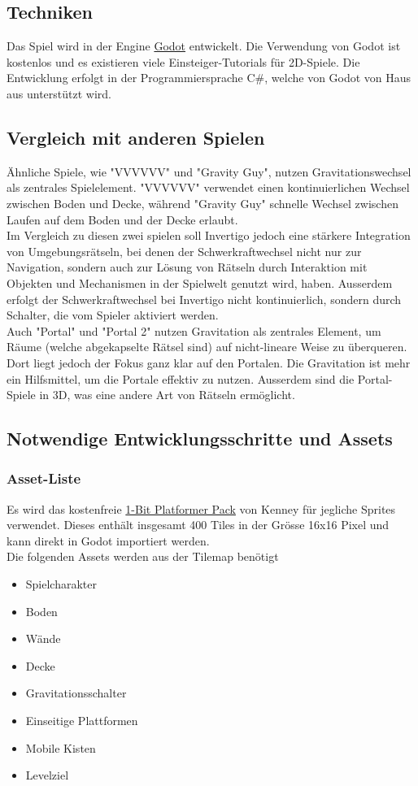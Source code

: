 \documentclass{article}
\begin{document}
\subsection{Techniken}
Das Spiel wird in der Engine \href{https://godotengine.org/}{Godot} entwickelt. Die Verwendung von Godot ist kostenlos und es existieren viele Einsteiger-Tutorials für 2D-Spiele.
Die Entwicklung erfolgt in der Programmiersprache C\#, welche von Godot von Haus aus unterstützt wird.

\subsection{Vergleich mit anderen Spielen}

Ähnliche Spiele, wie "VVVVVV" und "Gravity Guy", nutzen Gravitationswechsel als zentrales Spielelement.
"VVVVVV" verwendet einen kontinuierlichen Wechsel zwischen Boden und Decke, während "Gravity Guy" schnelle Wechsel zwischen Laufen auf dem Boden und der Decke erlaubt.
\\
Im Vergleich zu diesen zwei spielen soll Invertigo jedoch eine stärkere Integration von Umgebungsrätseln, bei denen der Schwerkraftwechsel nicht nur zur Navigation,
sondern auch zur Lösung von Rätseln durch Interaktion mit Objekten und Mechanismen in der Spielwelt genutzt wird, haben.
Ausserdem erfolgt der Schwerkraftwechsel bei Invertigo nicht kontinuierlich, sondern durch Schalter, die vom Spieler aktiviert werden.
\\
Auch "Portal" und "Portal 2" nutzen Gravitation als zentrales Element, um Räume (welche abgekapselte Rätsel sind) auf nicht-lineare Weise zu überqueren.
Dort liegt jedoch der Fokus ganz klar auf den Portalen. Die Gravitation ist mehr ein Hilfsmittel, um die Portale effektiv zu nutzen.
Ausserdem sind die Portal-Spiele in 3D, was eine andere Art von Rätseln ermöglicht.

\subsection{Notwendige Entwicklungsschritte und Assets}
\subsubsection{Asset-Liste}
Es wird das kostenfreie \href{https://kenney.nl/assets/1-bit-platformer-pack}{1-Bit Platformer Pack} von Kenney für jegliche Sprites verwendet.
Dieses enthält insgesamt 400 Tiles in der Grösse 16x16 Pixel und kann direkt in Godot importiert werden.
\\
Die folgenden Assets werden aus der Tilemap benötigt
\begin{itemize}
    \item Spielcharakter
    \item Boden
    \item Wände
    \item Decke
    \item Gravitationsschalter
    \item Einseitige Plattformen
    \item Mobile Kisten
    \item Levelziel
\end{itemize}
\end{document}

